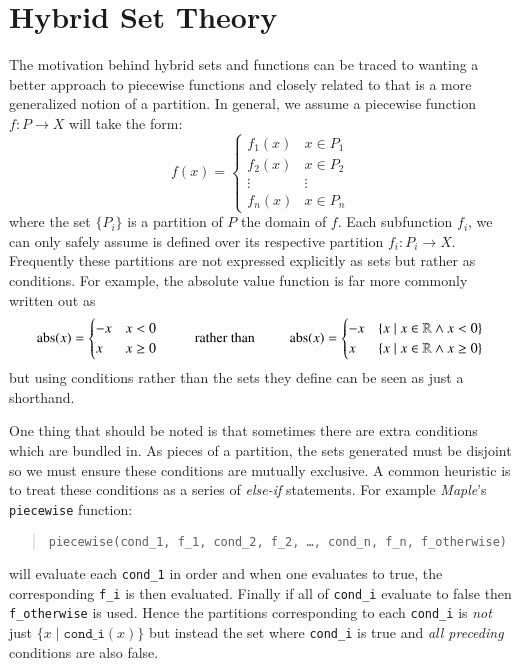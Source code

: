 \chapter{Hybrid Set Theory}


%
%


The motivation behind hybrid sets and functions can be traced to wanting a better approach to piecewise functions
and closely related to that is a more generalized notion of a partition.
In general, we assume a piecewise function $f : P \to X$ will take the form:
\begin{equation}
	\label{eq_fP}
	f(x) = 
	     \begin{cases}
	       f_1(x) & x \in P_1 \\
	       f_2(x) & x \in P_2 \\ 
	       \vdots & \vdots \\
	       f_n(x) & x \in P_n
	     \end{cases}
\end{equation}
where the set $\{ P _ i \}$ is a partition of $P$ the domain of $f$.
Each subfunction $f_i$, we can only safely assume is defined over its respective partition $f_i : P_i \to X$.
Frequently these partitions are not expressed explicitly as sets but rather as conditions.
For example, the absolute value function is far more commonly written out as
\begin{equation*}
	\text{abs}(x) = \begin{cases} -x & x < 0 \\ x & x \geq 0 \end{cases}
	\;\;\;\;\;\;\;\;\;\text{rather than}\;\;\;\;\;\;\;\;\;
	\text{abs}(x) = 
	\begin{cases}
		-x & \{x \;|\; x \in \mathbb{R} \wedge x < 0\}  \\ 
		x & \{x \;|\; x \in \mathbb{R} \wedge x \geq 0 \}
	\end{cases}
\end{equation*}
but using conditions rather than the sets they define can be seen as just a shorthand. 


One thing that should be noted is that sometimes there are extra conditions which are bundled in.
As pieces of a partition, the sets generated must be disjoint so we must ensure these conditions are mutually exclusive.
A common heuristic is to treat these conditions as a series of \emph{else-if} statements.
For example \emph{Maple}'s \texttt{piecewise} function:
\begin{quote}
	\texttt{piecewise(cond\_1, f\_1, cond\_2, f\_2, \ldots, cond\_n, f\_n, f\_otherwise)} 
\end{quote}	
will evaluate each \texttt{cond\_1} in order and when one evaluates to true, the corresponding \texttt{f\_i} is then evaluated.
Finally if all of \texttt{cond\_i} evaluate to false then \texttt{f\_otherwise} is used.
Hence the partitions corresponding to each \texttt{cond\_i} is \emph{not} just $\{ x \;|\; \texttt{cond\_i}(x) \}$
but instead the set where \texttt{cond\_i} is true and \emph{all preceding} conditions are also false.



